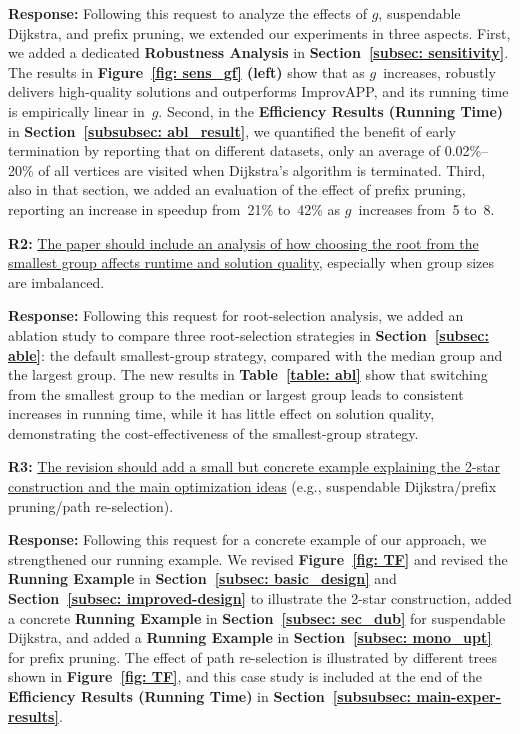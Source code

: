 \textbf{Response:} Following this request to analyze the effects of $g$, suspendable Dijkstra, and prefix pruning, we extended our experiments in three aspects.
First, we added a dedicated \textbf{Robustness Analysis} in \textbf{Section~\ref{subsec: sensitivity}}. The results in \textbf{Figure~\ref{fig: sens_gf} (left)} show that as $g$~increases, \ImprovPTS robustly delivers high-quality solutions and outperforms ImprovAPP, and its running time is empirically linear in~$g$.
Second, in the \textbf{Efficiency Results (Running Time)} in \textbf{Section~\ref{subsubsec: abl_result}}, we quantified the benefit of early termination by reporting that on different datasets, only an average of 0.02\%--20\% of all vertices are visited when Dijkstra's algorithm is terminated.
Third, also in that section, we added an evaluation of the effect of prefix pruning, reporting an increase in speedup from~21\% to~42\% as $g$~increases from~5 to~8.

\textbf{R2:} \uline{The paper should include an analysis of how choosing the root from the smallest group affects runtime and solution quality}, especially when group sizes are imbalanced.

\textbf{Response:} Following this request for root-selection analysis, we added an ablation study to compare three root-selection strategies in \textbf{Section~\ref{subsec: able}}: the default smallest-group strategy, compared with the median group and the largest group. The new results in \textbf{Table~\ref{table: abl}} show that switching from the smallest group to the median or largest group leads to consistent increases in running time, while it has little effect on solution quality, demonstrating the cost-effectiveness of the smallest-group strategy.

\textbf{R3:} \uline{The revision should add a small but concrete example explaining the 2-star construction and the main optimization ideas} (e.g., suspendable Dijkstra/prefix pruning/path re-selection).

\textbf{Response:} Following this request for a concrete example of our approach, we strengthened our running example. We revised \textbf{Figure~\ref{fig: TF}} and revised the \textbf{Running Example} in \textbf{Section~\ref{subsec: basic_design}} and \textbf{Section~\ref{subsec: improved-design}} to illustrate the 2-star construction, added a concrete \textbf{Running Example} in \textbf{Section~\ref{subsec: sec_dub}} for suspendable Dijkstra, and added a \textbf{Running Example} in \textbf{Section~\ref{subsec: mono_upt}} for prefix pruning. The effect of path re-selection is illustrated by different trees shown in \textbf{Figure~\ref{fig: TF}}, and this case study is included at the end of the \textbf{Efficiency Results (Running Time)} in \textbf{Section~\ref{subsubsec: main-exper-results}}.


